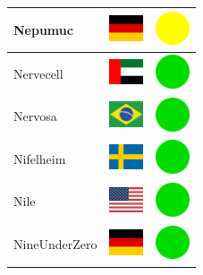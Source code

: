 \documentclass[12pt, a4paper, twoside]{report}
\begin{document}
\begin{center}
\begin{longtable}{|p{5cm}|p{2cm}|p{2cm}|}
 Nepumuc                                                    & \includegraphics[width=1cm]{4x3/de} &   \includegraphics[width=1cm]{likes/m} \\ \hline
 Nervecell                                                  & \includegraphics[width=1cm]{4x3/ae} &   \includegraphics[width=1cm]{likes/y} \\ \hline
 Nervosa                                                    & \includegraphics[width=1cm]{4x3/br} &   \includegraphics[width=1cm]{likes/y} \\ \hline
 Nifelheim                                                  & \includegraphics[width=1cm]{4x3/se} &   \includegraphics[width=1cm]{likes/y} \\ \hline
 Nile                                                       & \includegraphics[width=1cm]{4x3/us} &   \includegraphics[width=1cm]{likes/y} \\ \hline
 NineUnderZero                                              & \includegraphics[width=1cm]{4x3/de} &   \includegraphics[width=1cm]{likes/y} \\ \hline

\end{longtable}
\end{center}
\end{document}
